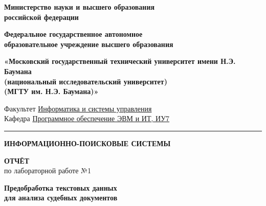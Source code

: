 \documentclass[12pt, a4paper]{report}
\begin{document}
\setcounter{chapter}{0}

\begin{titlepage}
\thispagestyle{empty}
\begin{center}

  {\sffamily\small\bfseries Министерство науки и высшего образования\\
  российской федерации}

  \vspace{6pt}
  {\sffamily\small\bfseries Федеральное государственное автономное\\
  образовательное учреждение высшего образования}

  \vspace{8pt}
  {\sffamily\normalsize\bfseries
  «Московский государственный технический университет имени Н.Э. Баумана\\
  (национальный исследовательский университет)\\
  (МГТУ им. Н.Э. Баумана)»}

  \vspace{6pt}
  {\sffamily\small Факультет \underline{Информатика и системы управления}}\\[2pt]
  {\sffamily\small Кафедра \underline{Программное обеспечение ЭВМ и ИТ, ИУ7}}

  \vspace{10pt}
  \textcolor{SteelBlue}{\rule{\linewidth}{1pt}}
  \vspace{12pt}

  {\sffamily\Large\bfseries\color{NavyBlue}
  ИНФОРМАЦИОННО-ПОИСКОВЫЕ СИСТЕМЫ}

  \vspace{20pt}

  {\sffamily\LARGE\bfseries ОТЧЁТ}\\[6pt]
  {\sffamily\large по лабораторной работе №1}

  \vspace{12pt}
  \begin{tcolorbox}[infobox, title={}]
    \centering\sffamily\large\bfseries\color{NavyBlue}
    Предобработка текстовых данных\\
    для анализа судебных документов
  \end{tcolorbox}

  \vspace{30pt}

\end{center}


\end{titlepage}
\end{document}
